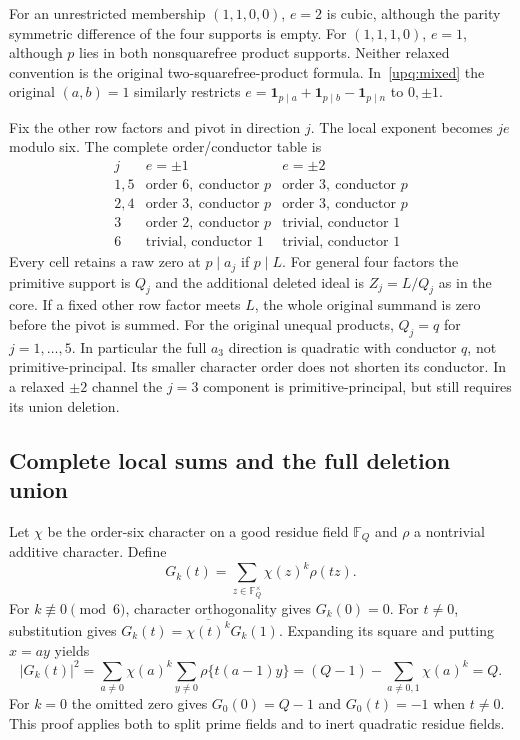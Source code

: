 For an unrestricted membership $(1,1,0,0)$, $e=2$ is cubic, although the
parity symmetric difference of the four supports is empty.
For $(1,1,1,0)$, $e=1$, although $p$ lies in both nonsquarefree product
supports. Neither relaxed convention is the original two-squarefree-product
formula. In~\eqref{upq:mixed} the original $(a,b)=1$ similarly restricts
$e=\mathbf1_{p\mid a}+\mathbf1_{p\mid b}-\mathbf1_{p\mid n}$
to $0,\pm1$.

Fix the other row factors and pivot in direction $j$. The local exponent
becomes $je$ modulo six. The complete order/conductor table is
\[
 \begin{array}{c|c|c}
 j&e=\pm1&e=\pm2\\ \hline
 1,5&\text{order }6,\ \text{conductor }p&
       \text{order }3,\ \text{conductor }p\\
 2,4&\text{order }3,\ \text{conductor }p&
       \text{order }3,\ \text{conductor }p\\
 3&\text{order }2,\ \text{conductor }p&
       \text{trivial,\ conductor }1\\
 6&\text{trivial,\ conductor }1&
       \text{trivial,\ conductor }1
 \end{array}
\]
Every cell retains a raw zero at $p\mid a_j$ if $p\mid L$.
For general four factors the primitive support is $Q_j$ and the additional
deleted ideal is $Z_j=L/Q_j$ as in the core. If a fixed other row factor
meets $L$, the whole original summand is zero before the pivot is summed.
For the original unequal products, $Q_j=q$ for $j=1,\ldots,5$.
In particular the full $a_3$ direction is quadratic with conductor $q$,
not primitive-principal. Its smaller character order does not shorten its
conductor. In a relaxed $\pm2$ channel the $j=3$ component is
primitive-principal, but still requires its union deletion.

\subsection{Complete local sums and the full deletion union}
Let $\chi$ be the order-six character on a good residue field
$\mathbb F_Q$ and $\rho$ a nontrivial additive character. Define
\[
 G_k(t)=\sum_{z\in\mathbb F_Q^\times}\chi(z)^k\rho(tz).
\]
For $k\not\equiv0\pmod6$, character orthogonality gives $G_k(0)=0$.
For $t\ne0$, substitution gives
$G_k(t)=\overline{\chi(t)^k}G_k(1)$. Expanding its square and putting
$x=ay$ yields
\[
 |G_k(t)|^2
 =\sum_{a\ne0}\chi(a)^k
       \sum_{y\ne0}\rho\{t(a-1)y\}
 =(Q-1)-\sum_{a\ne0,1}\chi(a)^k=Q.
\]
For $k=0$ the omitted zero gives $G_0(0)=Q-1$ and $G_0(t)=-1$
when $t\ne0$. This proof applies both to split prime fields and to inert
quadratic residue fields.

